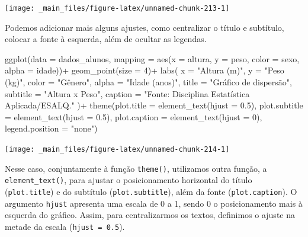 \documentclass[
  brazilian,
]{book}
\newenvironment{Shaded}{\begin{snugshade}}{\end{snugshade}}
\newcommand{\AttributeTok}[1]{\textcolor[rgb]{0.77,0.63,0.00}{#1}}
\newcommand{\DecValTok}[1]{\textcolor[rgb]{0.00,0.00,0.81}{#1}}
\newcommand{\FloatTok}[1]{\textcolor[rgb]{0.00,0.00,0.81}{#1}}
\newcommand{\FunctionTok}[1]{\textcolor[rgb]{0.00,0.00,0.00}{#1}}
\newcommand{\NormalTok}[1]{#1}
\newcommand{\SpecialCharTok}[1]{\textcolor[rgb]{0.00,0.00,0.00}{#1}}
\newcommand{\StringTok}[1]{\textcolor[rgb]{0.31,0.60,0.02}{#1}}
\begin{document}
\begin{center}\texttt{[image: \_main\_files/figure-latex/unnamed-chunk-213-1]} \end{center}

Podemos adicionar mais alguns ajustes, como centralizar o título e subtítulo, colocar a fonte à esquerda, além de ocultar as legendas.

\begin{Shaded}
\begin{Highlighting}[]
\FunctionTok{ggplot}\NormalTok{(}\AttributeTok{data =}\NormalTok{ dados\_alunos,}
       \AttributeTok{mapping =} \FunctionTok{aes}\NormalTok{(}\AttributeTok{x =}\NormalTok{ altura,}
                     \AttributeTok{y =}\NormalTok{ peso,}
                     \AttributeTok{color =}\NormalTok{ sexo,}
                     \AttributeTok{alpha =}\NormalTok{ idade))}\SpecialCharTok{+}
  \FunctionTok{geom\_point}\NormalTok{(}\AttributeTok{size =} \DecValTok{4}\NormalTok{)}\SpecialCharTok{+}
  \FunctionTok{labs}\NormalTok{(}
    \AttributeTok{x =} \StringTok{"Altura (m)"}\NormalTok{,}
    \AttributeTok{y =} \StringTok{"Peso (kg)"}\NormalTok{,}
    \AttributeTok{color =} \StringTok{"Gênero"}\NormalTok{,}
    \AttributeTok{alpha =} \StringTok{"Idade (anos)"}\NormalTok{,}
    \AttributeTok{title =} \StringTok{"Gráfico de dispersão"}\NormalTok{,}
    \AttributeTok{subtitle =} \StringTok{"Altura x Peso"}\NormalTok{,}
    \AttributeTok{caption =} \StringTok{"Fonte: Disciplina Estatística Aplicada/ESALQ."}
\NormalTok{  )}\SpecialCharTok{+}
  \FunctionTok{theme}\NormalTok{(}\AttributeTok{plot.title =} \FunctionTok{element\_text}\NormalTok{(}\AttributeTok{hjust =} \FloatTok{0.5}\NormalTok{),}
        \AttributeTok{plot.subtitle =} \FunctionTok{element\_text}\NormalTok{(}\AttributeTok{hjust =} \FloatTok{0.5}\NormalTok{),}
        \AttributeTok{plot.caption =} \FunctionTok{element\_text}\NormalTok{(}\AttributeTok{hjust =} \DecValTok{0}\NormalTok{),}
        \AttributeTok{legend.position =} \StringTok{"none"}\NormalTok{)}
\end{Highlighting}
\end{Shaded}

\begin{center}\texttt{[image: \_main\_files/figure-latex/unnamed-chunk-214-1]} \end{center}

Nesse caso, conjuntamente à função \texttt{theme()}, utilizamos outra função, a \texttt{element\_text()}, para ajustar o posicionamento horizontal do título (\texttt{plot.title}) e do subtítulo (\texttt{plot.subtitle}), além da fonte (\texttt{plot.caption}). O argumento \texttt{hjust} apresenta uma escala de 0 a 1, sendo 0 o posicionamento mais à esquerda do gráfico. Assim, para centralizarmos os textos, definimos o ajuste na metade da escala (\texttt{hjust\ =\ 0.5}).
\end{document}
